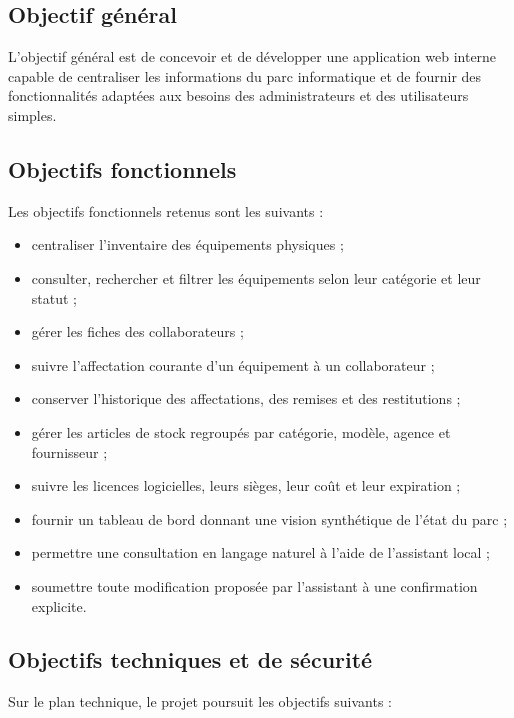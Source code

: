 \documentclass{rapportENSIAS}
\begin{document}
\subsection{Objectif général}

L’objectif général est de concevoir et de développer une application web interne capable de centraliser les informations du parc informatique et de fournir des fonctionnalités adaptées aux besoins des administrateurs et des utilisateurs simples.

\subsection{Objectifs fonctionnels}

Les objectifs fonctionnels retenus sont les suivants :

\begin{itemize}
\item centraliser l’inventaire des équipements physiques ;
\item consulter, rechercher et filtrer les équipements selon leur catégorie et leur statut ;
\item gérer les fiches des collaborateurs ;
\item suivre l’affectation courante d’un équipement à un collaborateur ;
\item conserver l’historique des affectations, des remises et des restitutions ;
\item gérer les articles de stock regroupés par catégorie, modèle, agence et fournisseur ;
\item suivre les licences logicielles, leurs sièges, leur coût et leur expiration ;
\item fournir un tableau de bord donnant une vision synthétique de l’état du parc ;
\item permettre une consultation en langage naturel à l’aide de l’assistant local ;
\item soumettre toute modification proposée par l’assistant à une confirmation explicite.
\end{itemize}

\subsection{Objectifs techniques et de sécurité}

Sur le plan technique, le projet poursuit les objectifs suivants :
\end{document}
